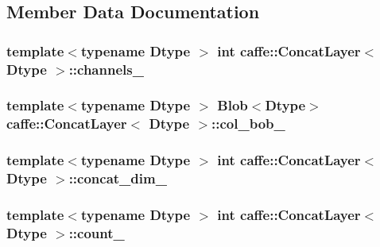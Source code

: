 \subsection{Member Data Documentation}
\hypertarget{classcaffe_1_1_concat_layer_a5f1ed4b44d327f638b683a6c34348e31}{
\subsubsection[{channels\+\_\+}]{\setlength{\rightskip}{0pt plus 5cm}template$<$typename Dtype $>$ int {\bf caffe\+::\+Concat\+Layer}$<$ Dtype $>$\+::channels\+\_\+\hspace{0.3cm}{\ttfamily [protected]}}}\label{classcaffe_1_1_concat_layer_a5f1ed4b44d327f638b683a6c34348e31}
\hypertarget{classcaffe_1_1_concat_layer_a03737f00c69377dd5170c407541d40ff}{
\subsubsection[{col\+\_\+bob\+\_\+}]{\setlength{\rightskip}{0pt plus 5cm}template$<$typename Dtype $>$ {\bf Blob}$<$Dtype$>$ {\bf caffe\+::\+Concat\+Layer}$<$ Dtype $>$\+::col\+\_\+bob\+\_\+\hspace{0.3cm}{\ttfamily [protected]}}}\label{classcaffe_1_1_concat_layer_a03737f00c69377dd5170c407541d40ff}
\hypertarget{classcaffe_1_1_concat_layer_a85d219531768269ba18f3c331ad94301}{
\subsubsection[{concat\+\_\+dim\+\_\+}]{\setlength{\rightskip}{0pt plus 5cm}template$<$typename Dtype $>$ int {\bf caffe\+::\+Concat\+Layer}$<$ Dtype $>$\+::concat\+\_\+dim\+\_\+\hspace{0.3cm}{\ttfamily [protected]}}}\label{classcaffe_1_1_concat_layer_a85d219531768269ba18f3c331ad94301}
\hypertarget{classcaffe_1_1_concat_layer_a2e8c2179da287e21df345183f431bd72}{
\subsubsection[{count\+\_\+}]{\setlength{\rightskip}{0pt plus 5cm}template$<$typename Dtype $>$ int {\bf caffe\+::\+Concat\+Layer}$<$ Dtype $>$\+::count\+\_\+\hspace{0.3cm}{\ttfamily [protected]}}}\label{classcaffe_1_1_concat_layer_a2e8c2179da287e21df345183f431bd72}
